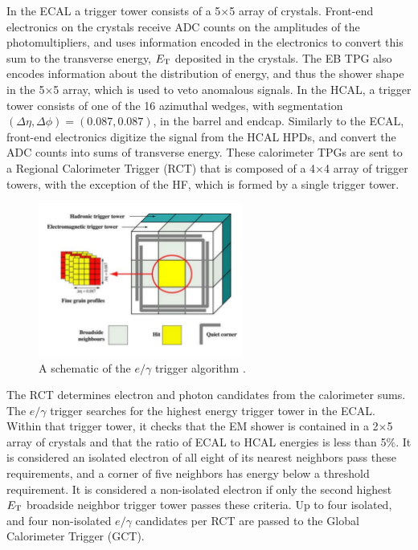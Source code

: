 \par In the ECAL a trigger tower consists of a 5$\times$5 array
of crystals.  Front-end electronics on the crystals receive ADC counts
on the amplitudes of the photomultipliers, and uses information
encoded in the electronics to convert this sum to the transverse
energy, $E_{\mathrm{T}}$ deposited in the crystals.  The EB TPG also encodes
information about the distribution of energy, and thus the shower
shape in the 5$\times$5 array, which is used to veto anomalous
signals.  In the HCAL, a trigger tower consists of one of the 16
azimuthal wedges, with segmentation $(\Delta\eta, \Delta\phi) =
(0.087, 0.087)$, in the barrel and endcap.  Similarly to the ECAL,
front-end electronics digitize the signal from the HCAL HPDs, and
convert the ADC counts into sums of transverse energy.  These
calorimeter TPGs are sent to a Regional Calorimeter Trigger (RCT) that
is composed of a 4$\times$4 array of trigger towers, with the
exception of the HF, which is formed by a single trigger tower.

\begin{figure}[h]
   \centering
  \includegraphics[width=0.6\textwidth]{Figures/CMS_Diagrams/Trigger__RCT_schematic.pdf}
  \caption{A schematic of the $e/\gamma$ trigger algorithm
    \cite{CMS:CMS_Machine_Chatrchyan:2008aa}. } \label{fig:tigger_rct_algo}
\end{figure}

\par The RCT determines electron and photon candidates from the
calorimeter sums.  The $e/\gamma$ trigger searches for the highest
energy trigger tower in the ECAL.  Within that trigger tower, it
checks that the EM shower is contained in a 2$\times$5 array of crystals
and that the ratio of ECAL to HCAL energies is less than 5$\%$.  It is
considered an isolated electron of all eight of its nearest neighbors
pass these requirements, and a corner of five neighbors has energy
below a threshold requirement.  It is considered a non-isolated
electron if only the second highest $E_{\mathrm{T}}$ broadside neighbor trigger
tower passes these criteria.  Up to four isolated, and four
non-isolated $e/\gamma$ candidates per RCT are passed to the Global
Calorimeter Trigger (GCT).  


